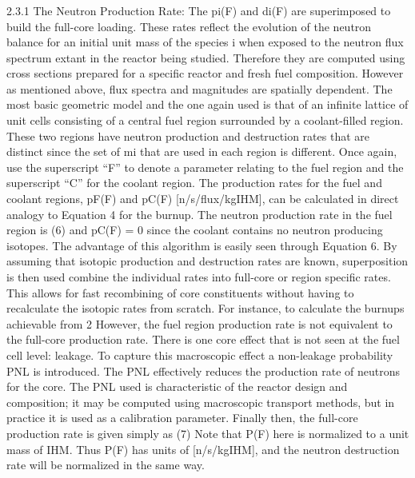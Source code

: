 \subsubsection{}
\label{1g_sec:}
2.3.1 The Neutron Production Rate:
 The pi(F) and di(F) are superimposed to build the full-core loading.  These rates reflect the evolution of the neutron balance for an initial unit mass of the species i when exposed to the neutron flux spectrum extant in the reactor being studied.  Therefore they are computed using cross sections prepared for a specific reactor and fresh fuel composition.
However as mentioned above, flux spectra and magnitudes are spatially dependent.  The most basic geometric model and the one again used is that of an infinite lattice of unit cells consisting of a central fuel region surrounded by a coolant-filled region.  These two regions have neutron production and destruction rates that are distinct since the set of mi that are used in each region is different.  Once again, use the superscript “F” to denote a parameter relating to the fuel region and the superscript “C” for the coolant region. 
The production rates for the fuel and coolant regions, pF(F) and pC(F) [n/s/flux/kgIHM], can be calculated in direct analogy to Equation 4 for the burnup.  The neutron production rate in the fuel region is 
                                (6)
and pC(F) = 0 since the coolant contains no neutron producing isotopes.  
The advantage of this algorithm is easily seen through Equation 6.  By assuming that isotopic production and destruction rates are known, superposition is then used combine the individual rates into full-core or region specific rates.  This allows for fast recombining of core constituents without having to recalculate the isotopic rates from scratch.  For instance, to calculate the burnups achievable from 2%
However, the fuel region production rate is not equivalent to the full-core production rate.  There is one core effect that is not seen at the fuel cell level: leakage.  To capture this macroscopic effect a non-leakage probability PNL is introduced.  The PNL effectively reduces the production rate of neutrons for the core. The PNL used is characteristic of the reactor design and composition; it may be computed using macroscopic transport methods, but in practice it is used as a calibration parameter.  Finally then, the full-core production rate is given simply as 
                                        (7)
Note that P(F) here is normalized to a unit mass of IHM.  Thus P(F) has units of [n/s/kgIHM], and the neutron destruction rate will be normalized in the same way.



